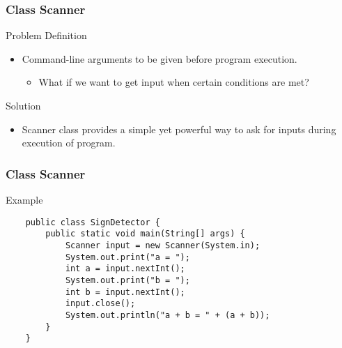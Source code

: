 \documentclass[10pt, compress]{beamer}
\begin{document}
\begin{frame}[fragile]
	\frametitle{Class Scanner}
	\begin{block}{Problem Definition}
		\begin{itemize}
			\item[] Command-line arguments to be given before program execution.
				\begin{itemize}
					\item[] What if we want to get input when certain conditions are met?
				\end{itemize}
		\end{itemize}
	\end{block}
	\begin{block}{Solution}
		\begin{itemize}
			\item[] Scanner class provides a simple yet powerful way to ask for inputs during execution of program.
		\end{itemize}
	\end{block}
\end{frame}

\begin{frame}[fragile]
	\frametitle{Class Scanner}
	\begin{block}{Example}
		\begin{verbatim}
	public class SignDetector {
		public static void main(String[] args) {
			Scanner input = new Scanner(System.in);
			System.out.print("a = ");
			int a = input.nextInt();
			System.out.print("b = ");
			int b = input.nextInt();
			input.close();
			System.out.println("a + b = " + (a + b));
		}
	}
		\end{verbatim}
	\end{block}
\end{frame}
\end{document}
